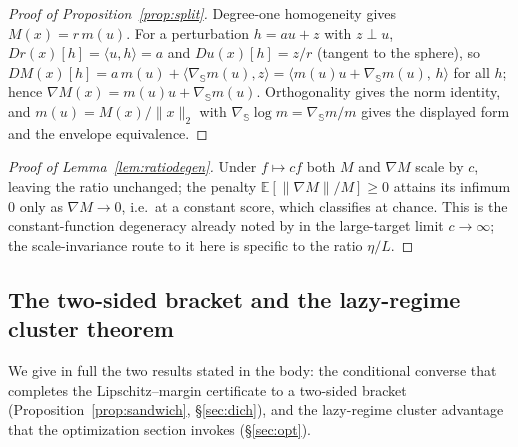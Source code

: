 \documentclass{article}
\theoremstyle{definition}
\begin{document}
\begin{proof}[Proof of Proposition~\ref{prop:split}]
Degree-one homogeneity gives $M(x)=r\,m(u)$. For a perturbation $h=au+z$ with $z\perp u$, $D r(x)[h]=\langle u,h\rangle=a$ and $D u(x)[h]=z/r$ (tangent to the sphere), so $DM(x)[h]=a\,m(u)+\langle\nabla_{\mathbb S}m(u),z\rangle=\langle m(u)u+\nabla_{\mathbb S}m(u),\,h\rangle$ for all $h$; hence $\nabla M(x)=m(u)u+\nabla_{\mathbb S}m(u)$. Orthogonality gives the norm identity, and $m(u)=M(x)/\|x\|_2$ with $\nabla_{\mathbb S}\log m=\nabla_{\mathbb S}m/m$ gives the displayed form and the envelope equivalence.
\end{proof}

\begin{proof}[Proof of Lemma~\ref{lem:ratiodegen}]
Under $f\mapsto cf$ both $M$ and $\nabla M$ scale by $c$, leaving the ratio unchanged; the penalty $\mathbb E[\|\nabla M\|/M]\ge0$ attains its infimum $0$ only as $\nabla M\to0$, i.e.\ at a constant score, which classifies at chance. This is the constant-function degeneracy already noted by \citet{tsuzuku2018lipschitz} in the large-target limit $c\to\infty$; the scale-invariance route to it here is specific to the ratio $\eta/L$.
\end{proof}

\subsection{The two-sided bracket and the lazy-regime cluster theorem}\label{app:bracket-lazy}
We give in full the two results stated in the body: the conditional converse that completes the Lipschitz--margin certificate to a two-sided bracket (Proposition~\ref{prop:sandwich}, \S\ref{sec:dich}), and the lazy-regime cluster advantage that the optimization section invokes (\S\ref{sec:opt}).
\end{document}
